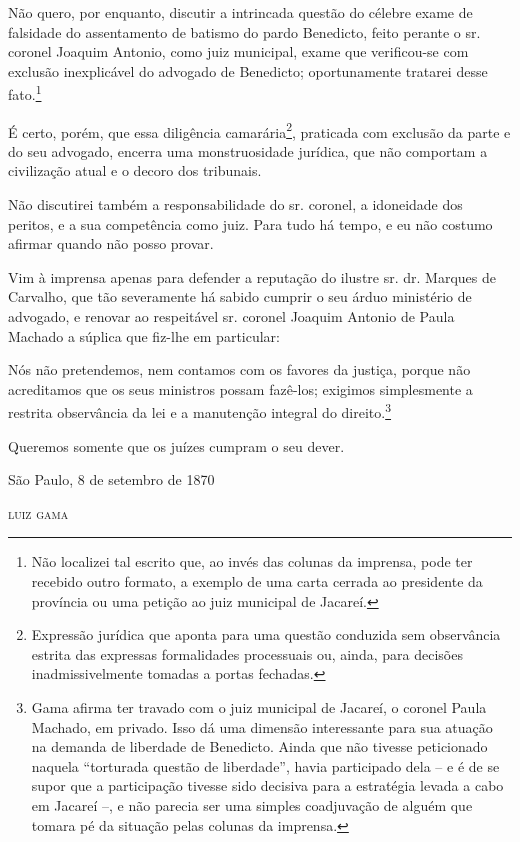 {Não quero, por enquanto, discutir a intrincada questão do célebre exame
de falsidade do assentamento de batismo do pardo Benedicto, feito
perante o sr. coronel Joaquim Antonio, como juiz municipal, exame que
verificou-se com exclusão inexplicável do advogado de Benedicto;
oportunamente tratarei desse fato.\footnote{ Não localizei tal escrito
  que, ao invés das colunas da imprensa, pode ter recebido outro
  formato, a exemplo de uma carta cerrada ao presidente da província ou
  uma petição ao juiz municipal de Jacareí.}

É certo, porém, que essa diligência camarária\footnote{ Expressão
  jurídica que aponta para uma questão conduzida sem observância estrita
  das expressas formalidades processuais ou, ainda, para decisões
  inadmissivelmente tomadas a portas fechadas.}, praticada com exclusão
da parte e do seu advogado, encerra uma monstruosidade jurídica, que não
comportam a civilização atual e o decoro dos tribunais.

Não discutirei também a responsabilidade do sr. coronel, a idoneidade
dos peritos, e a sua competência como juiz. Para tudo há tempo, e eu não
costumo afirmar quando não posso provar.

Vim à imprensa apenas para defender a reputação do ilustre sr. dr.
Marques de Carvalho, que tão severamente há sabido cumprir o seu árduo
ministério de advogado, e renovar ao respeitável sr. coronel Joaquim
Antonio de Paula Machado a súplica que fiz-lhe em particular:

Nós não pretendemos, nem contamos com os favores da justiça, porque não
acreditamos que os seus ministros possam fazê-los; exigimos simplesmente
a restrita observância da lei e a manutenção integral do
direito.\footnote{ Gama afirma ter travado com o juiz municipal de
  Jacareí, o coronel Paula Machado, em privado. Isso dá uma dimensão
  interessante para sua atuação na demanda de liberdade de Benedicto.
  Ainda que não tivesse peticionado naquela ``torturada questão de
  liberdade'', havia participado dela -- e é de se supor que a
  participação tivesse sido decisiva para a estratégia levada a cabo em
  Jacareí --, e não parecia ser uma simples coadjuvação de alguém que
  tomara pé da situação pelas colunas da imprensa.}

Queremos somente que os juízes cumpram o seu dever.

\begin{flushright}
São Paulo, 8 de setembro de 1870

\textsc{luiz gama}
\end{flushright}

}
